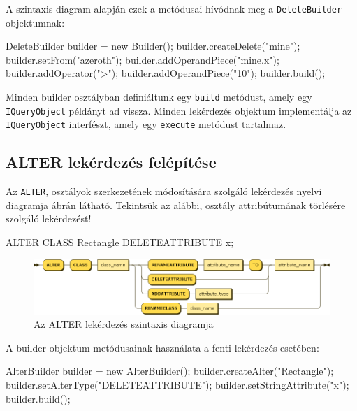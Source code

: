 A szintaxis diagram alapján ezek a metódusai hívódnak meg a \texttt{DeleteBuilder} objektumnak:

\begin{java}
DeleteBuilder builder = new Builder();
builder.createDelete("mine");
builder.setFrom("azeroth");
builder.addOperandPiece("mine.x");
builder.addOperator(">");
builder.addOperandPiece("10");
builder.build();
\end{java}

Minden builder osztályban definiáltunk egy \texttt{build} metódust, amely egy \\ \texttt{IQueryObject} példányt ad vissza. Minden lekérdezés objektum implementálja az \\ \texttt{IQueryObject} interfészt, amely egy \texttt{execute} metódust tartalmaz.

\subsection{ALTER lekérdezés felépítése}

Az \texttt{ALTER}, osztályok szerkezetének módosítására szolgáló lekérdezés nyelvi diagramja  ábrán látható. Tekintsük az alábbi, osztály attribútumának törlésére szolgáló lekérdezést!
\begin{sql}
ALTER CLASS Rectangle DELETEATTRIBUTE x;
\end{sql}

\begin{figure}[htb]
	\begin{center}
		\includegraphics[scale=0.48]{images/alter_class}
		\caption{Az ALTER lekérdezés szintaxis diagramja}
		\label{fig:alterSytnax}
	\end{center}
\end{figure}

A builder objektum metódusainak használata a fenti lekérdezés esetében:

\begin{java}
AlterBuilder builder = new AlterBuilder();
builder.createAlter("Rectangle");
builder.setAlterType("DELETEATTRIBUTE");
builder.setStringAttribute("x");
builder.build();
\end{java}

